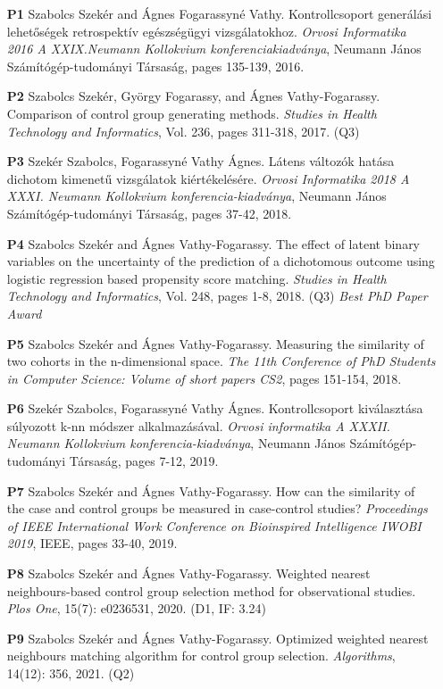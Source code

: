		\begin{itemize}
			\item[\textbf{P1}] Szabolcs Szekér and Ágnes Fogarassyné Vathy. Kontrollcsoport generálási lehetőségek retrospektív egészségügyi vizsgálatokhoz. \textit{Orvosi Informatika 2016 A XXIX.Neumann Kollokvium konferenciakiadványa}, Neumann János Számítógép-tudományi Társaság, pages 135-139, 2016.
			\item[\textbf{P2}] Szabolcs Szekér, György Fogarassy, and Ágnes Vathy-Fogarassy. Comparison of control group generating methods. \textit{Studies in Health Technology and Informatics}, Vol. 236, pages 311-318, 2017. (Q3)
			\item[\textbf{P3}] Szekér Szabolcs, Fogarassyné Vathy Ágnes. Látens változók hatása dichotom kimenetű vizsgálatok kiértékelésére. \textit{Orvosi Informatika 2018 A XXXI. Neumann Kollokvium konferencia-kiadványa}, Neumann János Számítógép-tudományi Társaság, pages 37-42, 2018.
			\item[\textbf{P4}] Szabolcs Szekér and Ágnes Vathy-Fogarassy. The effect of latent binary variables on the uncertainty of the prediction of a dichotomous outcome using logistic regression based propensity score matching. \textit{Studies in Health Technology and Informatics}, Vol. 248, pages 1-8, 2018. (Q3) \textit{Best PhD Paper Award}
                \item[\textbf{P5}] Szabolcs Szekér and Ágnes Vathy-Fogarassy. Measuring the similarity of two cohorts in the n-dimensional space. \textit{The 11th Conference of PhD Students in Computer Science: Volume of short papers CS2}, pages 151-154, 2018.
			\item[\textbf{P6}] Szekér Szabolcs, Fogarassyné Vathy Ágnes. Kontrollcsoport kiválasztása súlyozott k-nn módszer alkalmazásával. \textit{Orvosi informatika A XXXII. Neumann Kollokvium konferencia-kiadványa}, Neumann János Számítógép-tudományi Társaság, pages 7-12, 2019.
			\item[\textbf{P7}] Szabolcs Szekér and Ágnes Vathy-Fogarassy. How can the similarity of the case and control groups be measured in case-control studies? \textit{Proceedings of IEEE International Work Conference on Bioinspired Intelligence IWOBI 2019}, IEEE, pages 33-40, 2019.
			\item[\textbf{P8}] Szabolcs Szekér and Ágnes Vathy-Fogarassy. Weighted nearest neighbours-based control group selection method for observational studies. \textit{Plos One}, 15(7): e0236531, 2020. (D1, IF: 3.24)
			\item[\textbf{P9}] Szabolcs Szekér and Ágnes Vathy-Fogarassy. Optimized weighted nearest neighbours matching algorithm for control group selection. \textit{Algorithms}, 14(12): 356, 2021. (Q2)
			      			      			      	      	      			
		\end{itemize}

